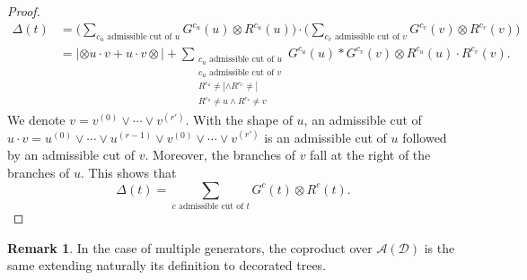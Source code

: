 \documentclass[10pt,a4paper]{amsart}
\numberwithin{equation}{section}
\theoremstyle{definition}
\newtheorem{Rq}[defi]{Remark}
\theoremstyle{plain}
\begin{document}
\begin{proof}
	\begin{align*}
		\Delta(t) &=\bigg( \sum_{c_u \text{ admissible cut of }u} G^{c_u}(u)\otimes R^{c_u}(u)\bigg)\cdot \bigg(\sum_{c_v \text{ admissible cut of }v}G^{c_v}(v)\otimes R^{c_v}(v) \bigg) \\
				&=|\otimes u\cdot v + u\cdot v\otimes |+ \sum_{\substack{c_u \text{ admissible cut of }u \\c_u \text{ admissible cut of }v\\ R^{c_u}\neq |\wedge R^{c_v}\neq | \\
				R^{c_u}\neq u \wedge R^{c_v}\neq v }} G^{c_u}(u)*G^{c_v}(v)\otimes R^{c_u}(u)\cdot R^{c_v}(v).
	\end{align*}
	We denote $v=v^{(0)}\vee \cdots \vee v^{\left(r'\right)}$.
	With the shape of $u$, an admissible cut of $u\cdot v=u^{(0)}\vee \cdots \vee u^{(r-1)}\vee v^{(0)}\vee \cdots \vee v^{\left(r'\right)}$ is an admissible cut of $u$ followed by an admissible cut of $v$. Moreover, the branches of $v$ fall at the right of the branches of $u$.
	This shows that
	\[
	\Delta(t)=\sum_{c \text{ admissible cut of }t} G^{c}(t)\otimes R^{c}(t).
	\tag*{\qed}\]
	\renewcommand{\qed}{}
\end{proof}

\begin{Rq}\label{Rq:multcoprod}
	In the case of multiple generators, the coproduct over $\mathcal{A}(\mathcal{D})$ is the same extending naturally its definition to decorated trees.
\end{Rq}
\end{document}
